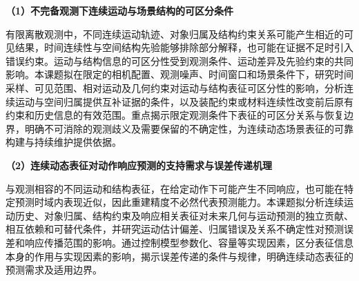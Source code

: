 \noindent\textbf{（1）不完备观测下连续运动与场景结构的可区分条件}

有限离散观测中，不同连续运动轨迹、对象归属及结构约束关系可能产生相近的可见结果，时间连续性与空间结构先验能够排除部分解释，也可能在证据不足时引入错误约束。运动与结构信息的可区分性受到观测条件、运动差异及先验约束的共同影响。本课题拟在限定的相机配置、观测噪声、时间窗口和场景条件下，研究时间采样、可见范围、相对运动及几何约束对运动与结构表征可区分性的影响，分析连续运动与空间归属提供互补证据的条件，以及装配约束或材料连续性改变前后原有约束和历史信息的有效范围。重点揭示限定观测条件下表征的可区分关系与恢复边界，明确不可消除的观测歧义及需要保留的不确定性，为连续动态场景表征的可靠构建与持续维护提供依据。

\noindent\textbf{（2）连续动态表征对动作响应预测的支持需求与误差传递机理}

与观测相容的不同运动和结构表征，在给定动作下可能产生不同响应，也可能在特定预测时域内表现近似，因此重建精度不必然代表预测能力。本课题拟分析连续运动历史、对象归属、结构约束及响应相关表征对未来几何与运动预测的独立贡献、相互依赖和可替代条件，并研究运动估计偏差、归属错误及关系不确定性对预测误差和响应传播范围的影响。通过控制模型参数化、容量等实现因素，区分表征信息本身的作用与实现因素的影响，揭示误差传递的条件与规律，明确连续动态表征的预测需求及适用边界。
